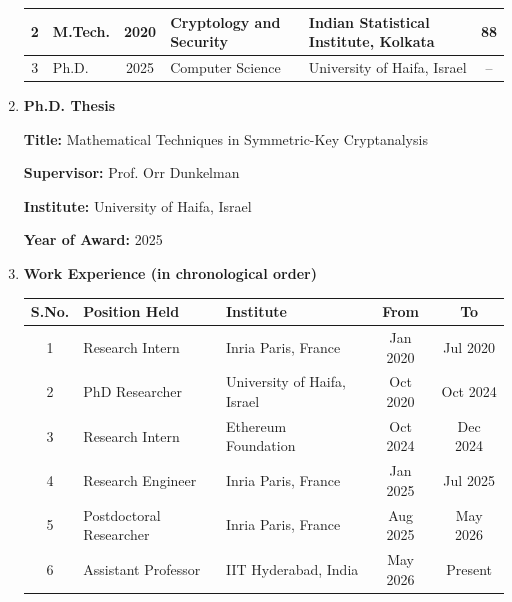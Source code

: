 \documentclass[11pt,a4paper]{article}
\begin{document}
\begin{enumerate}
\begin{center}
\begin{tabular}{|c|p{1.4cm}|c|p{3cm}|p{5cm}|c|}
2 &
M.Tech. &
2020 &
Cryptology and Security &
Indian Statistical Institute, Kolkata &
88 \\
\hline

3 &
Ph.D. &
2025 &
Computer Science &
University of Haifa, Israel &
-- \\
\hline

\end{tabular}
\end{center}

\item \textbf{Ph.D. Thesis}

\textbf{Title:} Mathematical Techniques in Symmetric-Key Cryptanalysis

\textbf{Supervisor:} Prof. Orr Dunkelman

\textbf{Institute:} University of Haifa, Israel

\textbf{Year of Award:} 2025

\item \textbf{Work Experience (in chronological order)}

\begin{center}
\begin{tabular}{|c|p{4.5cm}|p{4.5cm}|c|c|}
\hline
S.No. & Position Held &
Institute &
From &
To \\
\hline

1 & Research Intern & Inria Paris, France & Jan 2020 & Jul 2020 \\

\hline

2 & PhD Researcher & University of Haifa, Israel & Oct 2020 & Oct 2024 \\

\hline

3 & Research Intern & Ethereum Foundation & Oct 2024 & Dec 2024 \\

\hline

4 & Research Engineer & Inria Paris, France & Jan 2025 & Jul 2025 \\
\hline

5 & Postdoctoral Researcher & Inria Paris, France & Aug 2025 &May 2026 \\

\hline

6 & Assistant Professor & IIT Hyderabad, India & May 2026 &Present \\

\hline

\end{tabular}
\end{center}


\end{enumerate}
\end{document}

